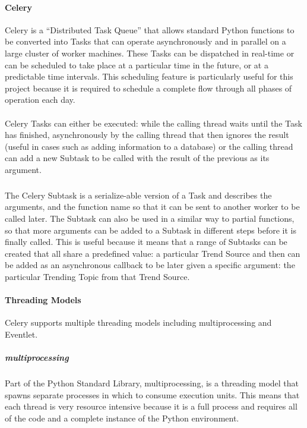 \paragraph{Celery}
Celery is a ``Distributed Task Queue'' that allows standard Python functions to be converted into Tasks that can operate asynchronously and in parallel on a large cluster of worker machines.  These Tasks can be dispatched in real-time or can be scheduled to take place at a particular time in the future, or at a predictable time intervals.  This scheduling feature is particularly useful for this project because it is required to schedule a complete flow through all phases of operation each day.

\paragraph{}
Celery Tasks can either be executed: while the calling thread waits until the Task has finished,  asynchronously by the calling thread that then ignores the result (useful in cases such as adding information to a database) or the calling thread can add a new Subtask to be called with the result of the previous as its argument.

\subparagraph{}
The Celery Subtask is a serialize-able version of a Task and describes the arguments, and the function name so that it can be sent to another worker to be called later.  The Subtask can also be used in a similar way to partial functions, so that more arguments can be added to a Subtask in different steps before it is finally called.  This is useful because it means that a range of Subtasks can be created that all share a predefined value: a particular Trend Source and then can be added as an asynchronous callback to be later given a specific argument: the particular Trending Topic from that Trend Source.

\paragraph{Threading Models}
Celery supports multiple threading models including multiprocessing and Eventlet.
\subparagraph{multiprocessing}
Part of the Python Standard Library, multiprocessing, is a threading model that spawns separate processes in which to consume execution units.  This means that each thread is very resource intensive because it is a full process and requires all of the code and a complete instance of the Python environment.

